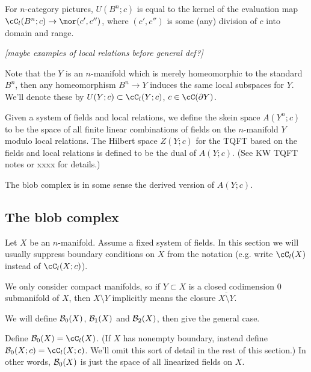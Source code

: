 \documentclass[11pt,leqno]{article}
\def\bc{{\cal B}}
\def\bd{\partial}
\def\sub{\subset}
\def\setmin{\setminus}
\def\nn#1{{{\it \small [#1]}}}
\begin{document}
For $n$-category pictures, $U(B^n; c)$ is equal to the kernel of the evaluation map
$\cC_l(B^n; c) \to \mor(c', c'')$, where $(c', c'')$ is some (any) division of $c$ into
domain and range.

\nn{maybe examples of local relations before general def?}

Note that the $Y$ is an $n$-manifold which is merely homeomorphic to the standard $B^n$,
then any homeomorphism $B^n \to Y$ induces the same local subspaces for $Y$.
We'll denote these by $U(Y; c) \sub \cC_l(Y; c)$, $c \in \cC(\bd Y)$.

Given a system of fields and local relations, we define the skein space
$A(Y^n; c)$ to be the space of all finite linear combinations of fields on
the $n$-manifold $Y$ modulo local relations.
The Hilbert space $Z(Y; c)$ for the TQFT based on the fields and local relations
is defined to be the dual of $A(Y; c)$.
(See KW TQFT notes or xxxx for details.)

The blob complex is in some sense the derived version of $A(Y; c)$.



\subsection{The blob complex}

Let $X$ be an $n$-manifold.
Assume a fixed system of fields.
In this section we will usually suppress boundary conditions on $X$ from the notation
(e.g. write $\cC_l(X)$ instead of $\cC_l(X; c)$).

We only consider compact manifolds, so if $Y \sub X$ is a closed codimension 0 
submanifold of $X$, then $X \setmin Y$ implicitly means the closure
$\overline{X \setmin Y}$.

We will define $\bc_0(X)$, $\bc_1(X)$ and $\bc_2(X)$, then give the general case.

Define $\bc_0(X) = \cC_l(X)$.
(If $X$ has nonempty boundary, instead define $\bc_0(X; c) = \cC_l(X; c)$.
We'll omit this sort of detail in the rest of this section.)
In other words, $\bc_0(X)$ is just the space of all linearized fields on $X$.
\end{document}
